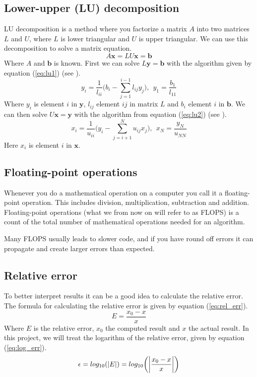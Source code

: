 \documentclass[reprint, english,notitlepage]{revtex4-1}  %
\begin{document}
\subsection{Lower-upper (LU) decomposition}

LU decomposition is a method where you factorize a matrix $A$ into two matrices $L$ and $U$, where $L$ is lower triangular and $U$ is upper triangular. We can use this decomposition to solve a matrix equation.
\begin{equation*}
	A\mathbf{x} = LU\mathbf{x} = \mathbf{b}
\end{equation*}
Where $A$ and $\mathbf{b}$ is known. First we can solve $L\mathbf{y}=\mathbf{b}$ with the algorithm given by equation (\ref{eq:lu1}) (see \citep{lu}).
\begin{equation}
	y_i = \frac{1}{l_{ii}}\bigg(b_i - \sum_{j=1}^{i-1}l_{ij}y_j\bigg),\ \ y_1 = \frac{b_1}{l_{11}}
	\label{eq:lu1}
\end{equation}
Where $y_i$ is element $i$ in $\mathbf{y}$, $l_{ij}$ element $ij$ in matrix $L$ and $b_i$ element $i$ in $\mathbf{b}$. We can then solve $U\mathbf{x} = \mathbf{y}$ with the algorithm from equation (\ref{eq:lu2}) (see \citep{lu}).
\begin{equation}
	x_i = \frac{1}{u_{ii}}\bigg(y_i - \sum_{j=i+1}^{N}u_{ij}x_j\bigg),\ \ x_N=\frac{y_N}{u_{NN}}
	\label{eq:lu2}
\end{equation}
Here $x_i$ is element $i$ in $\mathbf{x}$.


\subsection{Floating-point operations}
Whenever you do a mathematical operation on a computer you call it a floating-point operation. This includes division, multiplication, subtraction and addition. Floating-point operations (what we from now on will refer to as FLOPS) is a count of the total number of mathematical operations needed for an algorithm.

Many FLOPS usually leads to slower code, and if you have round off errors it can propagate and create larger errors than expected.


\subsection{Relative error}
To better interpret results it can be a good idea to calculate the relative error. The formula for calculating the relative error is given by equation (\ref{eq:rel_err}).
\begin{equation}
	E = \frac{x_0 - x}{x}
	\label{eq:rel_err}
\end{equation}
Where $E$ is the relative error, $x_0$ the computed result and $x$ the actual result. In this project, we will treat the logarithm of the relative error, given by equation (\ref{eq:log_err}).
\begin{equation}
	\epsilon = log_{10}(\abs{E}) = log_{10}\bigg(\abs{\frac{x_0-x}{x}}\bigg)
	\label{eq:log_err}
\end{equation}
\end{document}
